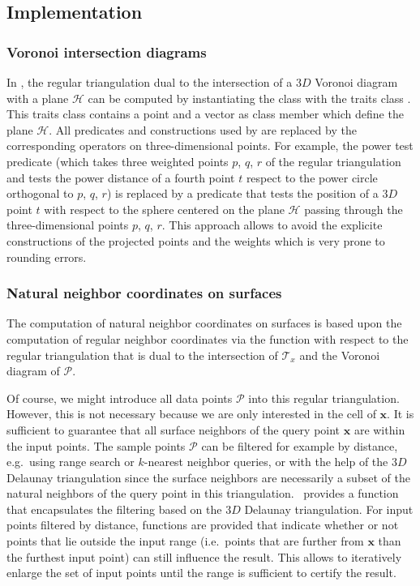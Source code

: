 \subsection{Implementation}
\subsubsection{Voronoi intersection diagrams}

In \cgal, the regular triangulation dual to the intersection of a $3D$
Voronoi diagram with a plane $\mathcal{H}$ can be computed by
instantiating the  class with
the traits class . This traits
class contains a point and a vector as class member which define the
plane $\mathcal{H}$. All predicates and constructions used by  are replaced by the corresponding operators on
three-dimensional points. For example, the power test predicate (which
takes three weighted points $p$, $q$, $r$ of the regular triangulation
and tests the power distance of a fourth point $t$ respect to the
power circle orthogonal to $p$, $q$, $r$) is replaced by a
 predicate that tests the
position of a $3D$ point $t$ with respect to the sphere centered on
the plane $\mathcal{H}$ passing through the three-dimensional points
$p$, $q$, $r$.  This approach allows to avoid the explicite
constructions of the projected points and the weights which is very
prone to rounding errors.

\subsubsection{Natural neighbor coordinates on surfaces}

The computation of natural neighbor coordinates on surfaces is based
upon the computation of regular neighbor coordinates via the function
 with respect to the regular
triangulation that is dual to the intersection of $\mathcal{T}_x$ and
the Voronoi diagram of $\mathcal{P}$.

Of course, we might introduce all data points $\mathcal{P}$ into 
this regular triangulation. However, this is not necessary because we are only interested in the cell of $\mathbf{x}$. It is sufficient to  
guarantee that all
surface neighbors of the query point $\mathbf{x}$ are within the 
input points. The
sample points $\mathcal{P}$ can be filtered for example by distance,
e.g.\ using range search or $k$-nearest neighbor queries, or with the
help of the $3D$ Delaunay triangulation since the surface neighbors
are necessarily a subset of the natural neighbors of the query point
in this triangulation. \cgal\ provides a function that encapsulates
the filtering based on the $3D$ Delaunay triangulation. For input
points filtered by distance, functions are provided that indicate
whether or not points that lie outside the input range (i.e.\ points
that are further from $\mathbf{x}$ than the furthest input point)
can still influence the result.  This allows to iteratively enlarge
the set of input points until the range is sufficient to certify the
result.

